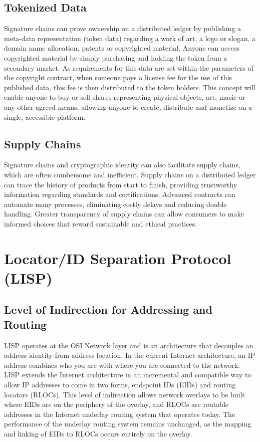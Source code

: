 \documentclass[11pt]{article}
\begin{document}
\subsection{Tokenized Data}

Signature chains can prove ownership on a distributed ledger by publishing a meta-data representation (token data) regarding a work of art, a logo or slogan, a domain name allocation, patents or copyrighted material.
Anyone can access copyrighted material by simply purchasing and holding the token from a secondary market.
As requirements for this data are set within the parameters of the copyright contract, when someone pays a license fee for the use of this published data, this fee is then distributed to the token holders.
This concept will enable anyone to buy or sell shares representing physical objects, art, music or any other agreed means, allowing anyone to create, distribute and monetize on a single, accessible platform.

\subsection{Supply Chains}

Signature chains and cryptographic identity can also facilitate supply chains, which are often cumbersome and inefficient.
Supply chains on a distributed ledger can trace the history of products from start to finish, providing trustworthy information regarding standards and certifications.
Advanced contracts can automate many processes, eliminating costly delays and reducing double handling.
Greater transparency of supply chains can allow consumers to make informed choices that reward sustainable and ethical practices.

\newpage
\section{Locator/ID Separation Protocol (LISP)}
\label{sec:LISP}

\subsection{Level of Indirection for Addressing and Routing}

LISP operates at the OSI Network layer and is an architecture that decouples an address identity from address location. In the current Internet architecture, an IP address combines who you are with where you are connected to the network. 
LISP extends the Internet architecture in an incremental and compatible way to allow IP addresses to come in two forms, end-point IDs (EIDs) and routing locators (RLOCs). 
This level of indirection allows network overlays to be built where EIDs are on the periphery of the overlay, and RLOCs are routable addresses in the Internet underlay routing system that operates today.
The performance of the underlay routing system remains unchanged, as the mapping and linking of EIDs to RLOCs occurs entirely on the overlay.
\end{document}
